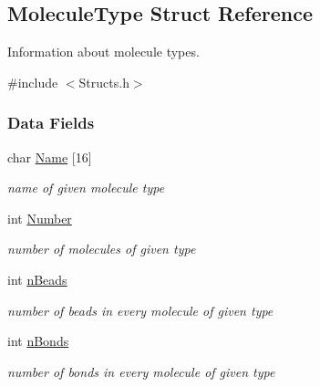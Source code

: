 \hypertarget{structMoleculeType}{}\subsection{Molecule\+Type Struct Reference}
\label{structMoleculeType}


Information about molecule types.  




{\ttfamily \#include $<$Structs.\+h$>$}

\subsubsection*{Data Fields}
\begin{DoxyCompactItemize}
\item 
\mbox{\label{structMoleculeType_ac4006b9a45d9962fe7f853c408f6db38}} 
char \hyperlink{structMoleculeType_ac4006b9a45d9962fe7f853c408f6db38}{Name} \mbox{[}16\mbox{]}
\begin{DoxyCompactList}\small\item\em name of given molecule type \end{DoxyCompactList}\item 
\mbox{\label{structMoleculeType_a7be636e4a748f11d31e82598b72077f4}} 
int \hyperlink{structMoleculeType_a7be636e4a748f11d31e82598b72077f4}{Number}
\begin{DoxyCompactList}\small\item\em number of molecules of given type \end{DoxyCompactList}\item 
\mbox{\label{structMoleculeType_ac48c34225da9a1e991f83db22d9450a0}} 
int \hyperlink{structMoleculeType_ac48c34225da9a1e991f83db22d9450a0}{n\+Beads}
\begin{DoxyCompactList}\small\item\em number of beads in every molecule of given type \end{DoxyCompactList}\item 
\mbox{\label{structMoleculeType_aea68f76e55d345a05bebc928e40f78c0}} 
int \hyperlink{structMoleculeType_aea68f76e55d345a05bebc928e40f78c0}{n\+Bonds}
\begin{DoxyCompactList}\small\item\em number of bonds in every molecule of given type \end{DoxyCompactList}\item 

\end{DoxyCompactItemize}
